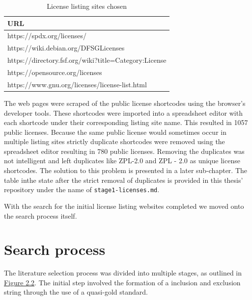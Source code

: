 \begin{table}[t]
	\begin{center}
		\begin{tabular}{||l||}
			\hline
			URL \\
			\hline
      https://spdx.org/licenses/ \\
      https://wiki.debian.org/DFSGLicenses \\
      https://directory.fsf.org/wiki?title=Category:License \\
      https://opensource.org/licenses \\
      https://www.gnu.org/licenses/license-list.html\\
			\hline
		\end{tabular}
		\caption{License listing sites chosen}
		\label{table:listing-sites}
	\end{center}
\end{table}

The web pages were scraped of the public license shortcodes using the browser's developer tools. These shortcodes were imported into a spreadsheet editor with each shortcode under their corresponding listing site name. This resulted in 1057 public licenses. Because the same public license would sometimes occur in multiple listing sites strictly duplicate shortcodes were removed using the spreadsheet editor resulting in 780 public licenses. Removing the duplicates was not intelligent and left duplicates like ZPL-2.0 and ZPL - 2.0 as unique license shortcodes. The solution to this problem is presented in a later sub-chapter. The table inthe state after the strict removal of duplicates is provided in this thesis' repository \citep{mscthesis} under the name of \texttt{stage1-licenses.md}.

With the search for the initial license listing websites completed we moved onto the search process itself.

\section{Search process}
The literature selection process was divided into multiple stages, as outlined in \hyperref[fig:search-process]{Figure 2.2}. The initial step involved the formation of a inclusion and exclusion string through the use of a quasi-gold standard.

